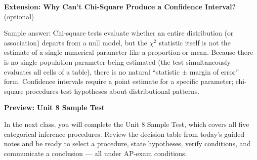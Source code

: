 \documentclass[10pt]{article}
\begin{document}
\begin{extensionbox}
\textbf{Extension: Why Can't Chi-Square Produce a Confidence Interval?} (optional)

\begin{teachernote}
Sample answer: Chi-square tests evaluate whether an entire distribution (or association) departs from a null model, but the $\chi^2$ statistic itself is not the estimate of a single numerical parameter like a proportion or mean. Because there is no single population parameter being estimated (the test simultaneously evaluates all cells of a table), there is no natural ``statistic $\pm$ margin of error'' form. Confidence intervals require a point estimate for a specific parameter; chi-square procedures test hypotheses about distributional patterns.
\end{teachernote}
\end{extensionbox}

\begin{reflectionbox}
\textbf{Preview: Unit 8 Sample Test}

In the next class, you will complete the Unit 8 Sample Test, which covers all five categorical
inference procedures. Review the decision table from today's guided notes and be ready to select
a procedure, state hypotheses, verify conditions, and communicate a conclusion --- all under
AP-exam conditions.
\end{reflectionbox}
\end{document}
